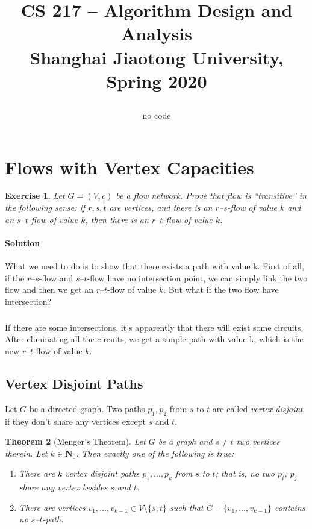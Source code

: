 \documentclass[12pt,a4]{article}
\newtheorem{theorem}{Theorem}%
\newtheorem{exercise}[theorem]{Exercise}
\begin{document}
\date{}

\title{CS 217 -- Algorithm Design and Analysis \\ 
  \vspace{3mm}
{\large	Shanghai Jiaotong University, Spring 2020\\
}
\author{no code}
}
\maketitle

\setcounter{section}{4}
\section{Flows with Vertex Capacities}


\begin{exercise}
    Let $G = (V,c)$ be a flow network. Prove that flow is ``transitive'' in the following sense: if $r,s,t$ are vertices, 
    and there is an $r$--$s$-flow of value $k$ and an $s$--$t$-flow of value $k$, then there is an $r$--$t$-flow of 
    value $k$.
\end{exercise}
\paragraph{Solution}What we need to do is to show that there exists a path with value k. First of all, if the $r$--$s$-flow and $s$--$t$-flow have no intersection point, we can simply link the two flow and then we get an $r$--$t$-flow of value $k$. But what if the two flow have intersection?
\subparagraph{}If there are some intersections, it's apparently that there will exist some circuits. After eliminating all the circuits, we get a simple path with value k, which is the new $r$--$t$-flow of value $k$.
\subsection{Vertex Disjoint Paths}

Let $G$ be a directed graph. Two paths $p_1, p_2$ from $s$ to $t$ are called {\em vertex disjoint}
if they don't share any vertices except $s$ and $t$. 

\begin{theorem}[Menger's Theorem]
   Let $G$ be a graph and $s \ne t$ two vertices therein. Let $k \in \mathbf{N}_0$. 
   Then exactly one of the following is true:
   \begin{enumerate}
   \item There are $k$ vertex disjoint paths $p_1,\dots,p_k$ from $s$ to $t$; that is, no two $p_i$, $p_j$ share
   any vertex besides $s$ and $t$.
   \item There are vertices $v_1,\dots,v_{k-1} \in V \setminus \{s,t\}$ such that
   $G - \{v_1,\dots, v_{k-1}\}$ contains no $s$--$t$-path.
   \end{enumerate}
\end{theorem}
\end{document}
